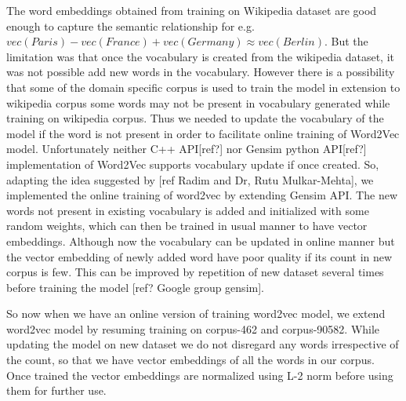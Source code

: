 The word embeddings obtained from training on Wikipedia dataset are good enough to capture the semantic relationship for e.g. $vec(Paris)-vec(France)+vec(Germany)\approx vec(Berlin)$. But the limitation was that once the vocabulary is created from the wikipedia dataset, it was not possible add new words in the vocabulary. However there is a possibility that some of the domain specific corpus is used to train the model in extension to wikipedia corpus some words may not be present in vocabulary generated while training on wikipedia corpus. Thus we needed to update the vocabulary of the model if the word is not present in order to facilitate online training of Word2Vec model. Unfortunately neither C++ API[ref?] nor Gensim python API[ref?] implementation of Word2Vec supports vocabulary update if once created. So, adapting the idea suggested by [ref Radim and Dr, Rutu Mulkar-Mehta], we implemented the online training of word2vec by extending Gensim API. The new words not present in existing vocabulary is added and initialized with some random weights, which can then be trained in usual manner to have vector embeddings. Although now the vocabulary can be updated in online manner but the vector embedding of newly added word have poor quality if its count in new corpus is few. This can be improved by repetition of new dataset several times before training the model [ref? Google group gensim].

So now when we have an online version of training word2vec model, we extend word2vec model by resuming training on corpus-462 and corpus-90582. While updating the model on new dataset we do not disregard any words irrespective of the count, so that we have vector embeddings of all the words in our corpus. Once trained the vector embeddings are normalized using L-2 norm before using them for further use. 

